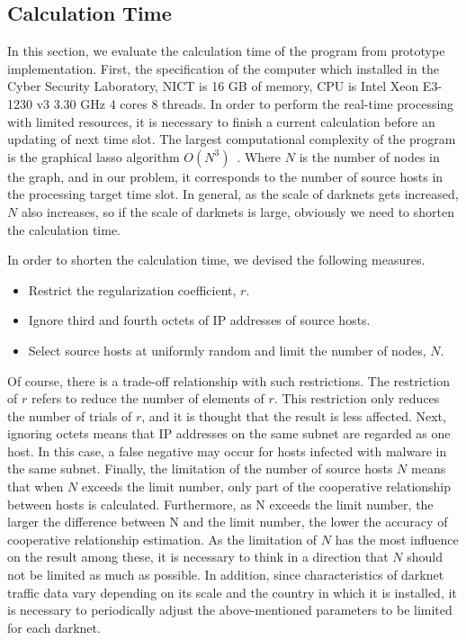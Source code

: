 \documentclass{sig-alternate-10pt}
\begin{document}
\subsection{Calculation Time}
In this section, we evaluate the calculation time of the program from prototype implementation.
First, the specification of the computer which installed in the Cyber Security Laboratory, NICT is 16 GB of memory, CPU is Intel Xeon E3-1230 v3 3.30 GHz 4 cores 8 threads.
In order to perform the real-time processing with limited resources, it is necessary to finish a current calculation before an updating of next time slot.
The largest computational complexity of the program is the graphical lasso algorithm $O(N^3)$~\cite{Witten}.
Where $N$ is the number of nodes in the graph, and in our problem, it corresponds to the number of source hosts in the processing target time slot.
In general, as the scale of darknets gets increased, $N$ also increases, so if the scale of darknets is large, obviously we need to shorten the calculation time.

In order to shorten the calculation time, we devised the following measures.
\begin{itemize}
	\item Restrict the regularization coefficient, $r$.
	\item Ignore third and fourth octets of IP addresses of source hosts.
	\item Select source hosts at uniformly random and limit the number of nodes, $N$.
\end{itemize}
Of course, there is a trade-off relationship with such restrictions.
The restriction of $r$ refers to reduce the number of elements of $r$.
This restriction only reduces the number of trials of $r$, and it is thought that the result is less affected.
Next, ignoring octets means that IP addresses on the same subnet are regarded as one host.
In this case, a false negative may occur for hosts infected with malware in the same subnet.
Finally, the limitation of the number of source hosts $N$ means that when $N$ exceeds the limit number, only part of the cooperative relationship between hosts is calculated.
Furthermore, as N exceeds the limit number, the larger the difference between N and the limit number, the lower the accuracy of cooperative relationship estimation.
As the limitation of $N$ has the most influence on the result among these, it is necessary to think in a direction that $N$ should not be limited as much as possible.
In addition, since characteristics of darknet traffic data vary depending on its scale and the country in which it is installed, it is necessary to periodically adjust the above-mentioned parameters to be limited for each darknet.
\end{document}

